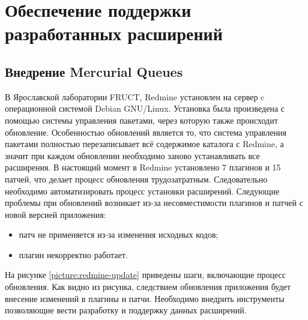 \chapter{Обеспечение поддержки разработанных расширений}
\section{Внедрение Mercurial Queues}
В Ярославской лаборатории FRUCT, Redmine установлен на сервер c операционной
системой Debian GNU/Linux. Установка была произведена с помощью системы
управления пакетами, через которую также происходит обновление. Особенностью
обновлений является то, что система управления пакетами полностью
перезаписывает всё содержимое каталога с Redmine, а значит при каждом
обновлении необходимо заново устанавливать все расширения. В настоящий момент в
Redmine установлено 7 плагинов и 15 патчей, что делает процесс обновления
трудозатратным. Следовательно необходимо автоматизировать процесс установки
расширений.
Следующие проблемы при обновлений возникает из-за несовместимости плагинов и
патчей с новой версией приложения:
\begin{itemize}
  \item патч не применяется из-за изменения исходных кодов;
  \item плагин некорректно работает.
\end{itemize}
На рисунке \ref{picture:redmine-update} приведены шаги, включающие процесс
обновления. Как видно из рисунка, следствием обновления приложения будет
внесение изменений в плагины и патчи. Необходимо внедрить инструменты
позволяющие вести разработку и поддержку данных расширений.

